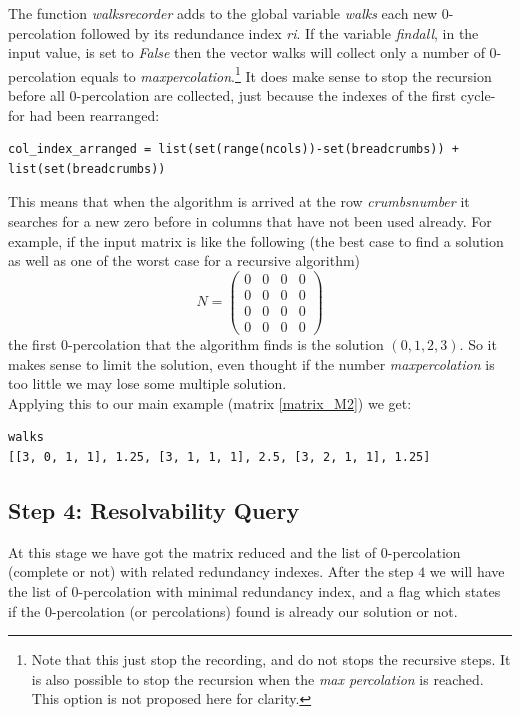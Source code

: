 \documentclass[12pt]{ClasseMatematicamente}
\begin{document}
\noindent
The function \emph{walks\textunderscore recorder} adds to the global variable \emph{walks} each new $0$-percolation followed by its redundance index \emph{ri}.
If the variable \emph{find\textunderscore all}, in the input value, is set to \emph{False} then the vector walks will collect only a number of $0$-percolation equals to \emph{max\textunderscore percolation}.\footnote{Note that this just stop the recording, and do not stops the recursive steps. It is also possible to stop the recursion when the \emph{max \textunderscore percolation} is reached. This option is not proposed here for clarity.} It does make sense to stop the recursion before all $0$-percolation are collected, just because the indexes of the first cycle-for had been rearranged:
\begin{small}
\begin{lstlisting}
col_index_arranged = list(set(range(ncols))-set(breadcrumbs)) + list(set(breadcrumbs))
\end{lstlisting}
\end{small}
This means that when the algorithm is arrived at the row \emph{crumbs\textunderscore number} it searches for a new zero before in columns that have not been used already. For example, if the input matrix is like the following (the best case to find a solution as well as one of the worst case for a recursive algorithm) 
$$
N = 
\left(\begin{array}{rrrr}
0 & 0 & 0 & 0 \\
0 & 0 & 0 & 0 \\
0 & 0 & 0 & 0 \\
0 & 0 & 0 & 0
\end{array}\right)
$$
the first $0$-percolation that the algorithm finds is the solution $(0,1,2,3)$. So it makes sense to limit the solution, even thought if the number \emph{max\textunderscore percolation} is too little we may lose some multiple solution.\\
Applying this to our main example (matrix \ref{matrix_M2}) we get:
\begin{small}
\begin{lstlisting}
walks 
[[3, 0, 1, 1], 1.25, [3, 1, 1, 1], 2.5, [3, 2, 1, 1], 1.25]
\end{lstlisting}
\end{small}

\subsection*{Step 4: Resolvability Query}
At this stage we have got the matrix reduced and the list of $0$-percolation (complete or not) with related redundancy indexes. 
After the step $4$ we will have the list of $0$-percolation with minimal redundancy index, and a flag which states if the $0$-percolation (or percolations) found is already our solution or not.
\end{document}
